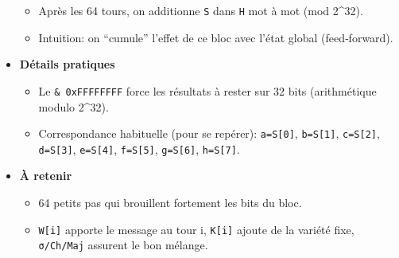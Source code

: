 \documentclass[11pt]{article}
\providecommand{\tightlist}{%
      \setlength{\itemsep}{0pt}\setlength{\parskip}{0pt}}
\begin{document}
\begin{itemize}
  \begin{itemize}
  \tightlist
  \item
    Après les 64 tours, on additionne \texttt{S} dans \texttt{H} mot à
    mot (mod 2\^{}32).
  \item
    Intuition: on ``cumule'' l'effet de ce bloc avec l'état global
    (feed‑forward).
  \end{itemize}
\item
  \textbf{Détails pratiques}

  \begin{itemize}
  \tightlist
  \item
    Le \texttt{\&\ 0xFFFFFFFF} force les résultats à rester sur 32 bits
    (arithmétique modulo 2\^{}32).
  \item
    Correspondance habituelle (pour se repérer): \texttt{a=S{[}0{]}},
    \texttt{b=S{[}1{]}}, \texttt{c=S{[}2{]}}, \texttt{d=S{[}3{]}},
    \texttt{e=S{[}4{]}}, \texttt{f=S{[}5{]}}, \texttt{g=S{[}6{]}},
    \texttt{h=S{[}7{]}}.
  \end{itemize}
\item
  \textbf{À retenir}

  \begin{itemize}
  \tightlist
  \item
    64 petits pas qui brouillent fortement les bits du bloc.
  \item
    \texttt{W{[}i{]}} apporte le message au tour i, \texttt{K{[}i{]}}
    ajoute de la variété fixe, \texttt{σ/Ch/Maj} assurent le bon
    mélange.
  \end{itemize}
\end{itemize}
\end{document}
